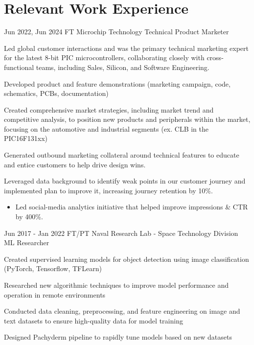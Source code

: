 \documentclass[
	12pt, %
]{FreemanCV}
\begin{document}
\section{Relevant Work Experience}

\jobentry
	{Jun 2022, Jun 2024} %
	{FT} %
	{Microchip Technology} %
	{Technical Product Marketer} %
	{ %
		\item Led global customer interactions and was the primary technical marketing expert for the latest 8-bit PIC microcontrollers, collaborating closely with cross-functional teams, including Sales, Silicon, and Software Engineering.
		\item Developed product and feature demonstrations (marketing campaign, code, schematics, PCBs, documentation)
		\item Created comprehensive market strategies, including market trend and competitive analysis, to position new products and peripherals within the market, focusing on the automotive and industrial segments (ex. CLB in the PIC16F131xx)
		\item Generated outbound marketing collateral around technical features to educate and entice customers to help drive design wins.
		\item Leveraged data background to identify weak points in our customer journey and implemented plan to improve it, increasing journey retention by 10\%.
		\begin{itemize}[topsep=-10pt]
		\item Led social-media analytics initiative that helped improve impressions \& CTR by 400\%.
		\end{itemize}
	} 


\jobentry
	{Jun 2017 - Jan 2022} %
	{FT/PT} %
	{Naval Research Lab - Space Technology Division} %
	{ML Researcher} %
	{ %
		\item Created supervised learning models for object detection using image classification (PyTorch, Tensorflow, TFLearn)
		\item Researched new algorithmic techniques to improve model performance and operation in remote environments
		\item Conducted data cleaning, preprocessing, and feature engineering on image and text datasets to ensure high-quality data for model training
		\item Designed Pachyderm pipeline to rapidly tune models based on new datasets
	} 
	
\end{document}
